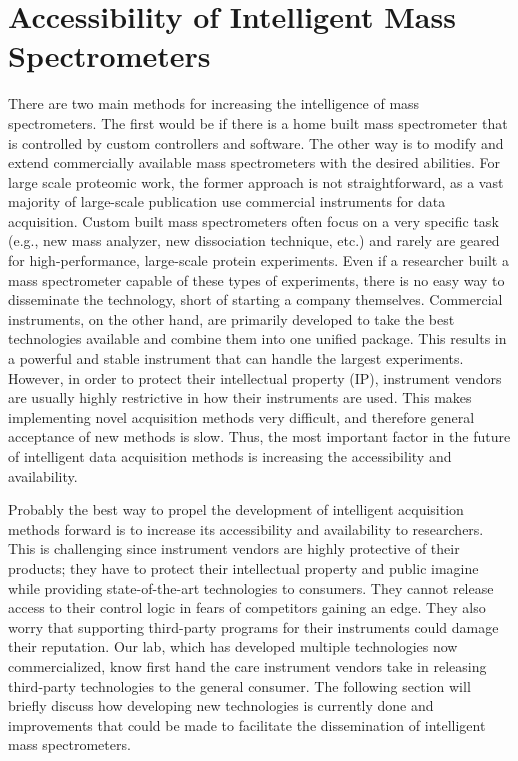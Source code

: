 \section{Accessibility of Intelligent Mass Spectrometers}
There are two main methods for increasing the intelligence of mass spectrometers. The first would be if there is a home built mass spectrometer that is controlled by custom controllers and software. The other way is to modify and extend commercially available mass spectrometers with the desired abilities. For large scale proteomic work, the former approach is not straightforward, as a vast majority of large-scale publication use commercial instruments for data acquisition. Custom built mass spectrometers often focus on a very specific task (e.g., new mass analyzer, new dissociation technique, etc.) and rarely are geared for high-performance, large-scale protein experiments. Even if a researcher built a mass spectrometer capable of these types of experiments, there is no easy way to disseminate the technology, short of starting a company themselves. Commercial instruments, on the other hand, are primarily developed to take the best technologies available and combine them into one unified package. This results in a powerful and stable instrument that can handle the largest experiments. However, in order to protect their intellectual property (IP), instrument vendors are usually highly restrictive in how their instruments are used. This makes implementing novel acquisition methods very difficult, and therefore general acceptance of new methods is slow. Thus, the most important factor in the future of intelligent data acquisition methods is increasing the accessibility and availability.

Probably the best way to propel the development of intelligent acquisition methods forward is to increase its accessibility and availability to researchers. This is challenging since instrument vendors are highly protective of their products; they have to protect their intellectual property and public imagine while providing state-of-the-art technologies to consumers. They cannot release access to their control logic in fears of competitors gaining an edge. They also worry that supporting third-party programs for their instruments could damage their reputation. Our lab, which has developed multiple technologies now commercialized, know first hand the care instrument vendors take in releasing third-party technologies to the general consumer. The following section will briefly discuss how developing new technologies is currently done and improvements that could be made to facilitate the dissemination of intelligent mass spectrometers.  

